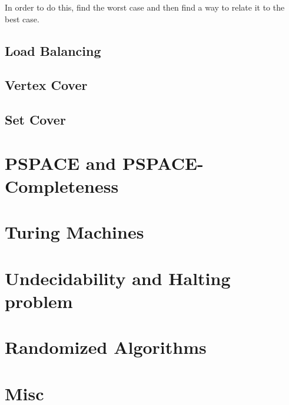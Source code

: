 \documentclass{article}
\begin{document}
In order to do this, find the worst case and then find a way to relate it to the best case.

\subsection{Load Balancing}
\subsection{Vertex Cover}
\subsection{Set Cover}
\section{PSPACE and PSPACE-Completeness}
\section{Turing Machines}
\section{Undecidability and Halting problem}
\section{Randomized Algorithms}
\section{Misc}
\end{document}
